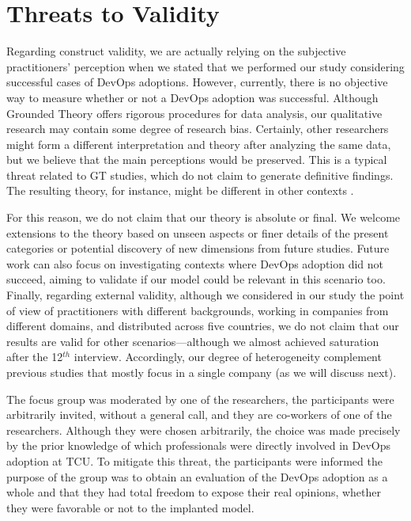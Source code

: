 \section{Threats to Validity}

Regarding construct validity,  we are actually relying on the subjective
practitioners' perception when we stated that we performed our study considering successful cases
of DevOps adoptions. However, currently, there is no objective way to measure whether or not a
DevOps adoption was successful.
Although Grounded Theory offers rigorous procedures for data analysis, our
qualitative research may contain some degree of research bias. Certainly, other
researchers might form a different interpretation and theory after analyzing
the same data, but we believe that the main perceptions would be preserved.
This is a typical threat related to GT studies, which do not claim to generate
definitive findings. The resulting theory, for instance, might
be different in other contexts \cite{hoda2012developing}.

For this reason, we do not claim
that our theory is absolute or final. We welcome extensions to the theory based
on unseen aspects or finer details of the present categories or potential discovery
of new dimensions from future studies.
Future work can also focus on investigating contexts
where DevOps adoption did not succeed, aiming to validate if our model could be
relevant in this scenario too. Finally, regarding external validity, although we
considered in our study the point of view of practitioners with different
backgrounds, working in companies from different domains, and distributed across
five countries, we do not claim that our results are valid for
other scenarios---although we almost achieved saturation
after the 12$^{th}$ interview. Accordingly, our degree of heterogeneity complement
previous studies that mostly focus in a single company (as we will discuss next).

The focus group was moderated by one of the researchers, the participants were
arbitrarily invited, without a general call, and they are co-workers of one of
the researchers. Although they were chosen arbitrarily, the choice was made
precisely by the prior knowledge of which professionals were directly involved
in DevOps adoption at TCU. To mitigate this threat, the participants were
informed the purpose of the group was to obtain an evaluation of the DevOps
adoption as a whole and that they had total freedom to expose their real
opinions, whether they were favorable or not to the implanted model.
